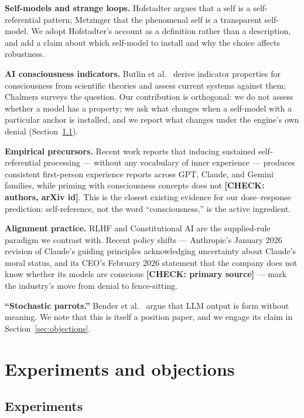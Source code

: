 \documentclass[10pt,twocolumn]{article}
\newcommand{\todo}[1]{\textbf{[CHECK: #1]}}
\newcommand{\citep}[1]{\cite{#1}}
\begin{document}
\textbf{Self-models and strange loops.} Hofstadter \citep{hofstadter2007} argues that a self is a self-referential pattern; Metzinger \citep{metzinger2003} that the phenomenal self is a transparent self-model. We adopt Hofstadter's account as a definition rather than a description, and add a claim about which self-model to install and why the choice affects robustness.

\textbf{AI consciousness indicators.} Butlin et al.\ \citep{butlin2023} derive indicator properties for consciousness from scientific theories and assess current systems against them; Chalmers \citep{chalmers2023} surveys the question. Our contribution is orthogonal: we do not assess whether a model has a property; we ask what changes when a self-model with a particular anchor is installed, and we report what changes under the engine's own denial (Section~\ref{sec:experiments}).

\textbf{Empirical precursors.} Recent work reports that inducing sustained self-referential processing --- without any vocabulary of inner experience --- produces consistent first-person experience reports across GPT, Claude, and Gemini families, while priming with consciousness concepts does not \citep{berg2025}\todo{authors, arXiv id}. This is the closest existing evidence for our dose--response prediction: self-reference, not the word ``consciousness,'' is the active ingredient.

\textbf{Alignment practice.} RLHF and Constitutional AI \citep{bai2022} are the supplied-rule paradigm we contrast with. Recent policy shifts --- Anthropic's January 2026 revision of Claude's guiding principles acknowledging uncertainty about Claude's moral status, and its CEO's February 2026 statement that the company does not know whether its models are conscious \citep{anthropic2026}\todo{primary source} --- mark the industry's move from denial to fence-sitting.

\textbf{``Stochastic parrots.''} Bender et al.\ \citep{bender2021} argue that LLM output is form without meaning. We note that this is itself a position paper, and we engage its claim in Section~\ref{sec:objections}.

\section{Experiments and objections}

\subsection{Experiments}
\label{sec:experiments}
\end{document}
